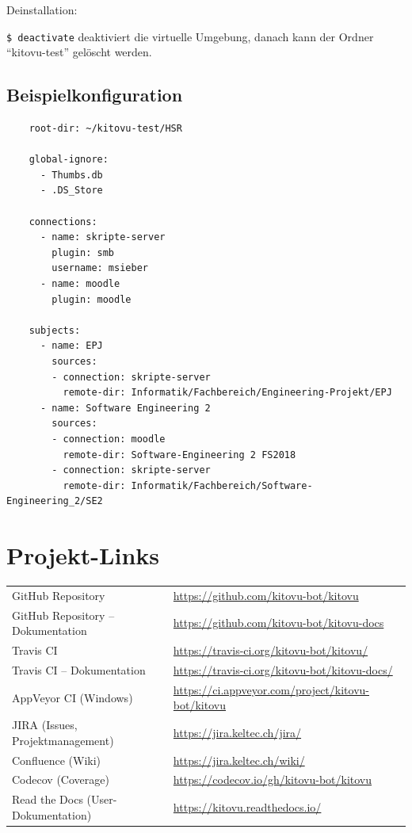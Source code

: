 \documentclass[a4paper]{article}
\let\oldsection\section
\renewcommand\section{\clearpage\oldsection}
\begin{document}
Deinstallation: 

\verb|$ deactivate| deaktiviert die virtuelle Umgebung, danach kann der Ordner ``kitovu-test'' gelöscht werden.

\newpage

\subsection{Beispielkonfiguration}
	\begin{verbatim}
	root-dir: ~/kitovu-test/HSR
	
	global-ignore:
	  - Thumbs.db
	  - .DS_Store
	
	connections:
	  - name: skripte-server
	    plugin: smb
	    username: msieber
	  - name: moodle
	    plugin: moodle
	
	subjects:
	  - name: EPJ
	    sources:
	    - connection: skripte-server
	      remote-dir: Informatik/Fachbereich/Engineering-Projekt/EPJ
	  - name: Software Engineering 2
	    sources:
	    - connection: moodle
	      remote-dir: Software-Engineering 2 FS2018
	    - connection: skripte-server
	      remote-dir: Informatik/Fachbereich/Software-Engineering_2/SE2
	\end{verbatim}

\section{Projekt-Links}
\begin{tabulary}{\linewidth}{ll}
  GitHub Repository & \url{https://github.com/kitovu-bot/kitovu} \\
  GitHub Repository -- Dokumentation & \url{https://github.com/kitovu-bot/kitovu-docs} \\
  Travis CI & \url{https://travis-ci.org/kitovu-bot/kitovu/} \\
  Travis CI -- Dokumentation & \url{https://travis-ci.org/kitovu-bot/kitovu-docs/} \\
  AppVeyor CI (Windows) & \url{https://ci.appveyor.com/project/kitovu-bot/kitovu} \\
  JIRA (Issues, Projektmanagement) & \url{https://jira.keltec.ch/jira/} \\
  Confluence (Wiki) & \url{https://jira.keltec.ch/wiki/} \\
  Codecov (Coverage) & \url{https://codecov.io/gh/kitovu-bot/kitovu} \\
  Read the Docs (User-Dokumentation) & \url{https://kitovu.readthedocs.io/}
\end{tabulary}
\end{document}
